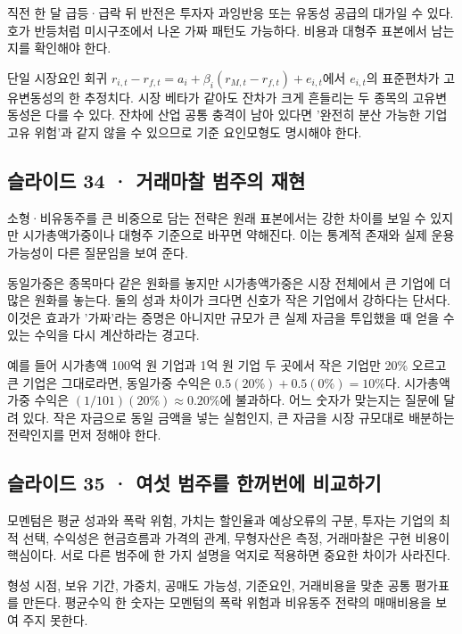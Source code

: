 \documentclass[11pt,a4paper]{article}
\begin{document}
직전 한 달 급등·급락 뒤 반전은 투자자 과잉반응 또는 유동성 공급의 대가일 수 있다. 호가 반등처럼 미시구조에서 나온 가짜 패턴도 가능하다. 비용과 대형주 표본에서 남는지를 확인해야 한다.\par

단일 시장요인 회귀 $r_{i,t}-r_{f,t}=a_i+\beta_i(r_{M,t}-r_{f,t})+e_{i,t}$에서 $e_{i,t}$의 표준편차가 고유변동성의 한 추정치다. 시장 베타가 같아도 잔차가 크게 흔들리는 두 종목의 고유변동성은 다를 수 있다. 잔차에 산업 공통 충격이 남아 있다면 '완전히 분산 가능한 기업 고유 위험'과 같지 않을 수 있으므로 기준 요인모형도 명시해야 한다.\par

\subsection{슬라이드 34 · 거래마찰 범주의 재현}
소형·비유동주를 큰 비중으로 담는 전략은 원래 표본에서는 강한 차이를 보일 수 있지만 시가총액가중이나 대형주 기준으로 바꾸면 약해진다. 이는 통계적 존재와 실제 운용 가능성이 다른 질문임을 보여 준다.\par

동일가중은 종목마다 같은 원화를 놓지만 시가총액가중은 시장 전체에서 큰 기업에 더 많은 원화를 놓는다. 둘의 성과 차이가 크다면 신호가 작은 기업에서 강하다는 단서다. 이것은 효과가 '가짜'라는 증명은 아니지만 규모가 큰 실제 자금을 투입했을 때 얻을 수 있는 수익을 다시 계산하라는 경고다.\par

예를 들어 시가총액 100억 원 기업과 1억 원 기업 두 곳에서 작은 기업만 20\% 오르고 큰 기업은 그대로라면, 동일가중 수익은 $0.5(20\%)+0.5(0\%)=10\%$다. 시가총액가중 수익은 $(1/101)(20\%)\approx0.20\%$에 불과하다. 어느 숫자가 맞는지는 질문에 달려 있다. 작은 자금으로 동일 금액을 넣는 실험인지, 큰 자금을 시장 규모대로 배분하는 전략인지를 먼저 정해야 한다.\par

\subsection{슬라이드 35 · 여섯 범주를 한꺼번에 비교하기}
모멘텀은 평균 성과와 폭락 위험, 가치는 할인율과 예상오류의 구분, 투자는 기업의 최적 선택, 수익성은 현금흐름과 가격의 관계, 무형자산은 측정, 거래마찰은 구현 비용이 핵심이다. 서로 다른 범주에 한 가지 설명을 억지로 적용하면 중요한 차이가 사라진다.\par

형성 시점, 보유 기간, 가중치, 공매도 가능성, 기준요인, 거래비용을 맞춘 공통 평가표를 만든다. 평균수익 한 숫자는 모멘텀의 폭락 위험과 비유동주 전략의 매매비용을 보여 주지 못한다.\par
\end{document}
